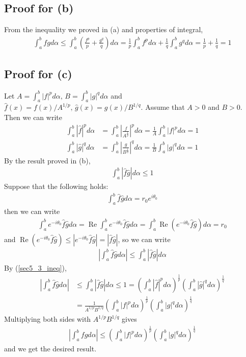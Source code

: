 \documentclass{scrartcl}
\newcommand{\real}{\operatorname{Re}}
\begin{document}
\subsection{Proof for (b)}
From the inequality we proved in (a) and properties of integral,
\begin{align*}
  \int^b_a fg d\alpha
  \leq \int^b_a \left( \frac{f^p}{p} + \frac{g^q}{q} \right) d\alpha
  = \frac{1}{p} \int^b_a f^p d\alpha + \frac{1}{q} \int^b_a g^q d\alpha
  = \frac{1}{p} + \frac{1}{q} = 1
\end{align*}

\subsection{Proof for (c)}
Let \(A = \int^b_a |f|^p d\alpha,\, B = \int^b_a |g|^q d\alpha\) and \(\hat{f}(x) = f(x) / A^{1 / p},\, \hat{g}(x) = g(x) / B^{1 / q}\).
Assume that \(A > 0\) and \(B > 0\).
Then we can write
\begin{align*}
  \int^b_a |\hat{f}|^p d\alpha
  &= \int^b_a \left| \frac{f}{A^\frac{1}{p}} \right|^p d\alpha
  = \frac{1}{A} \int^b_a |f|^p d\alpha
  = 1 \\
  \int^b_a |\hat{g}|^q d\alpha
  &= \int^b_a \left| \frac{g}{B^\frac{1}{q}} \right|^q d\alpha
  = \frac{1}{B} \int^b_a |g|^q d\alpha
  = 1
\end{align*}
By the result proved in (b),
\begin{align}\label{sec5_3_ineq}
  \int^b_a |\hat{f} \hat{g}| d\alpha \leq 1
\end{align}
Suppose that the following holds:
\begin{align*}
  \int^b_a \hat{f} \hat{g} d\alpha = r_0 e^{i\theta_0}
\end{align*}
then we can write
\begin{align*}
  \int^b_a e^{-i\theta_0} \hat{f} \hat{g} d\alpha
  = \real \int^b_a e^{-i\theta_0} \hat{f} \hat{g} d\alpha
  = \int^b_a \real (e^{-i\theta_0} \hat{f} \hat{g}) d\alpha
  = r_0
\end{align*}
and \(\real (e^{-i\theta_0} \hat{f} \hat{g}) \leq |e^{-i\theta_0} \hat{f} \hat{g}| = |\hat{f} \hat{g}|\), so we can write
\begin{align*}
  \left| \int^b_a \hat{f} \hat{g} d\alpha \right| \leq \int^b_a |\hat{f} \hat{g}| d\alpha
\end{align*}
By (\ref{sec5_3_ineq}),
\begin{align*}
  \left| \int^b_a \hat{f} \hat{g} d\alpha \right|
  &\leq \int^b_a |\hat{f} \hat{g}| d\alpha
  \leq 1
  = \left( \int^b_a |\hat{f}|^p d\alpha \right)^\frac{1}{p} \left( \int^b_a |\hat{g}|^q d\alpha \right)^\frac{1}{q} \\
  &= \frac{1}{A^{1 / p} B^{1 / q}} \left( \int^b_a |f|^p d\alpha \right)^\frac{1}{p} \left( \int^b_a |g|^q d\alpha \right)^\frac{1}{q}
\end{align*}
Multiplying both sides with \(A^{1 / p} B^{1 / q}\) gives
\begin{align*}
  \left| \int^b_a fg d\alpha \right| \leq \left( \int^b_a |f|^p d\alpha \right)^\frac{1}{p} \left( \int^b_a |g|^q d\alpha \right)^\frac{1}{q}
\end{align*}
and we get the desired result.
\end{document}
